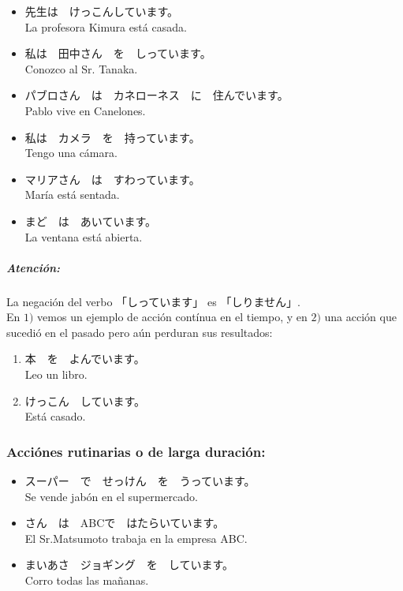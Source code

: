 \documentclass[a4paper,12pt,oneside]{report}
\def\bv{\textbf{V}} %
\begin{document}
\begin{CJK*}{UTF8}{min}
        \fbox{\bv(て) います}

        \begin{itemize}
          \item {}先生は　けっこんしています。\\
                La profesora Kimura est\'a casada.
          \item 私は　田中さん　を　しっています。\\
                Conozco al Sr. Tanaka.
          \item パブロさん　は　カネローネス　に　住んでいます。\\
                Pablo vive en Canelones.
          \item 私は　カメラ　を　持っています。\\
                Tengo una c\'amara.
          \item マリアさん　は　すわっています。\\
                Mar\'ia est\'a sentada.
          \item まど　は　あいています。\\
                La ventana est\'a abierta.
        \end{itemize}

        \subparagraph{Atenci\'on:}
          La negaci\'on del verbo 「しっています」 es 「しりません」.\\

        En $1)$ vemos un ejemplo de acci\'on cont\'inua en el tiempo, y en $2)$ una acci\'on que sucedi\'o en el pasado pero a\'un perduran sus resultados:

        \begin{enumerate}
          \item 本　を　よんでいます。\\
                Leo un libro.
          \item けっこん　しています。\\
                Est\'a casado.
        \end{enumerate}

      \subsubsection{Acci\'ones rutinarias o de larga duraci\'on:}
        \fbox{\bv(て) います}

        \begin{itemize}
          \item スーパー　で　せっけん　を　うっています。\\
                Se vende jab\'on en el supermercado.
          \item {}さん　は　ABCで　はたらいています。\\
                El Sr.Matsumoto trabaja en la empresa ABC.
          \item まいあさ　ジョギング　を　しています。\\
                Corro todas las mañanas.
        \end{itemize}
        \hfill


\end{CJK*}
\end{document}
